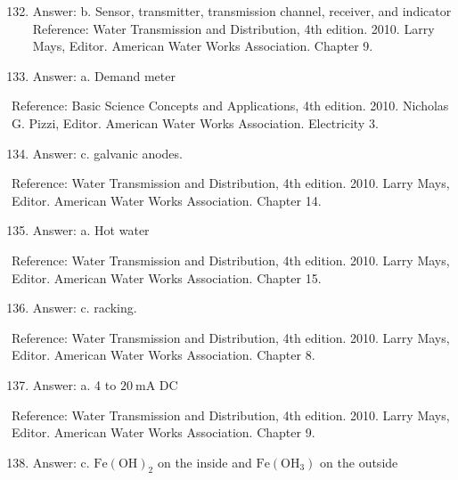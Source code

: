 \documentclass[10pt]{article}
\begin{document}
\begin{enumerate}
  \setcounter{enumi}{131}
  \item Answer: b. Sensor, transmitter, transmission channel, receiver, and indicator Reference: Water Transmission and Distribution, 4th edition. 2010. Larry Mays, Editor. American Water Works Association. Chapter 9.

  \item Answer: a. Demand meter

\end{enumerate}

Reference: Basic Science Concepts and Applications, 4th edition. 2010. Nicholas G. Pizzi, Editor. American Water Works Association. Electricity 3.

\begin{enumerate}
  \setcounter{enumi}{133}
  \item Answer: c. galvanic anodes.
\end{enumerate}

Reference: Water Transmission and Distribution, 4th edition. 2010. Larry Mays, Editor. American Water Works Association. Chapter 14.

\begin{enumerate}
  \setcounter{enumi}{134}
  \item Answer: a. Hot water
\end{enumerate}

Reference: Water Transmission and Distribution, 4th edition. 2010. Larry Mays, Editor. American Water Works Association. Chapter 15.

\begin{enumerate}
  \setcounter{enumi}{135}
  \item Answer: c. racking.
\end{enumerate}

Reference: Water Transmission and Distribution, 4th edition. 2010. Larry Mays, Editor. American Water Works Association. Chapter 8.

\begin{enumerate}
  \setcounter{enumi}{136}
  \item Answer: a. 4 to $20 \mathrm{~mA}$ DC
\end{enumerate}

Reference: Water Transmission and Distribution, 4th edition. 2010. Larry Mays, Editor. American Water Works Association. Chapter 9.

\begin{enumerate}
  \setcounter{enumi}{137}
  \item Answer: c. $\mathrm{Fe}(\mathrm{OH})_{2}$ on the inside and $\mathrm{Fe}\left(\mathrm{OH}_{3}\right)$ on the outside
\end{enumerate}
\end{document}
